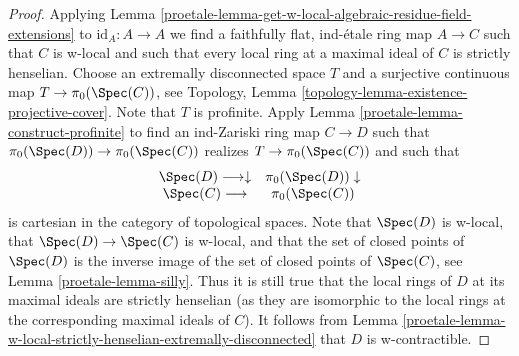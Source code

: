 \begin{proof}

Applying Lemma \ref{proetale-lemma-get-w-local-algebraic-residue-field-extensions}
to $\text{id}_A : A \to A$ we find a faithfully flat, ind-\'etale ring map
$A \to C$ such that $C$ is w-local and such that every local ring at a
maximal ideal of $C$ is strictly henselian.
Choose an extremally disconnected space $T$ and a surjective
continuous map $T \to \pi_0(\Spec(C))$, see
Topology, Lemma \ref{topology-lemma-existence-projective-cover}.
Note that $T$ is profinite. Apply Lemma \ref{proetale-lemma-construct-profinite}
to find an ind-Zariski ring map $C \to D$ such that
$\pi_0(\Spec(D)) \to \pi_0(\Spec(C))$ realizes $T \to \pi_0(\Spec(C))$
and such that
$$
\begin{array}{cc}\Spec(D) \longrightarrow\downarrow & \pi_0(\Spec(D)) \downarrow \\ \Spec(C) \longrightarrow & \pi_0(\Spec(C))\end{array}
$$
is cartesian in the category of topological spaces. Note that $\Spec(D)$
is w-local, that $\Spec(D) \to \Spec(C)$ is w-local, and that the
set of closed points of $\Spec(D)$ is the inverse image of the
set of closed points of $\Spec(C)$, see Lemma \ref{proetale-lemma-silly}.
Thus it is still true that the local rings of $D$ at its maximal
ideals are strictly henselian (as they are isomorphic to the
local rings at the corresponding maximal ideals of $C$).
It follows from
Lemma \ref{proetale-lemma-w-local-strictly-henselian-extremally-disconnected}
that $D$ is w-contractible.
\end{proof}


